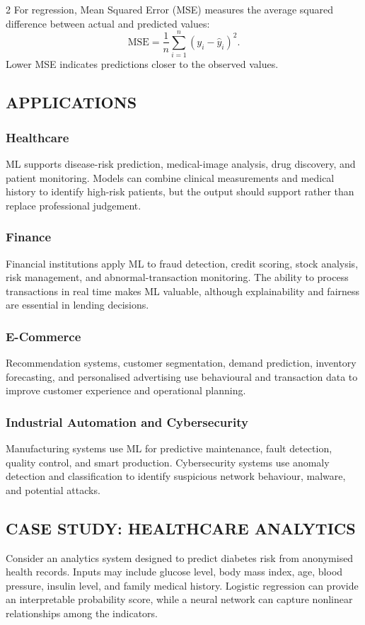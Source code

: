 \begin{multicols}{2}
  \noindent
  For regression, Mean Squared Error (MSE) measures the average squared difference between actual and predicted values:
  \[
    \text{MSE}=\frac{1}{n}\sum_{i=1}^{n}(y_i-\hat{y}_i)^2.
  \]
  Lower MSE indicates predictions closer to the observed values.

  \subsection*{\centering\uppercase{Applications}}
  \subsubsection*{Healthcare}
  ML supports disease-risk prediction, medical-image analysis, drug discovery, and patient monitoring. Models can combine clinical measurements and medical history to identify high-risk patients, but the output should support rather than replace professional judgement.

  \subsubsection*{Finance}
  Financial institutions apply ML to fraud detection, credit scoring, stock analysis, risk management, and abnormal-transaction monitoring. The ability to process transactions in real time makes ML valuable, although explainability and fairness are essential in lending decisions.

  \subsubsection*{E-Commerce}
  Recommendation systems, customer segmentation, demand prediction, inventory forecasting, and personalised advertising use behavioural and transaction data to improve customer experience and operational planning.

  \subsubsection*{Industrial Automation and Cybersecurity}
  Manufacturing systems use ML for predictive maintenance, fault detection, quality control, and smart production. Cybersecurity systems use anomaly detection and classification to identify suspicious network behaviour, malware, and potential attacks.

  \subsection*{\centering\uppercase{Case Study: Healthcare Analytics}}
  Consider an analytics system designed to predict diabetes risk from anonymised health records. Inputs may include glucose level, body mass index, age, blood pressure, insulin level, and family medical history. Logistic regression can provide an interpretable probability score, while a neural network can capture nonlinear relationships among the indicators.


\end{multicols}
